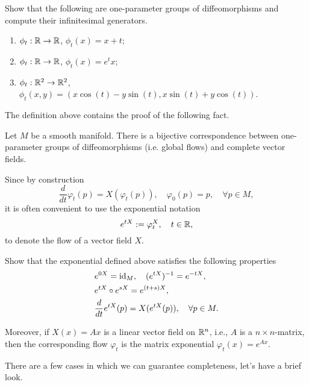 \begin{exercise}
  Show that the following are one-parameter groups of diffeomorphisms and compute their infinitesimal generators.
  \begin{enumerate}
    \item $\phi_t:\mathbb{R}\to\mathbb{R}$, $\phi_t(x) = x + t$;
    \item $\phi_t:\mathbb{R}\to\mathbb{R}$, $\phi_t(x) = e^t x$;
    \item $\phi_t:\mathbb{R}^2\to\mathbb{R}^2$, $\phi_t(x,y) = (x\cos(t) - y\sin(t), x\sin(t)+y\cos(t))$.
  \end{enumerate}
\end{exercise}

The definition above contains the proof of the following fact.
\begin{proposition}
  Let $M$ be a smooth manifold. There is a bijective correspondence between one-parameter groups of diffeomorphisms (i.e. global flows) and complete vector fields.
\end{proposition}

\begin{notation}
  Since by construction
  \begin{equation}
    \frac{d}{d t}\varphi_t(p) = X(\varphi_t(p)), \quad
    \varphi_0(p) = p, \quad \forall p\in M,
  \end{equation}
  it is often convenient to use the exponential notation
  \begin{equation}
    e^{t X} := \varphi^X_t, \quad t\in\mathbb{R},
  \end{equation}
  to denote the flow of a vector field $X$.
\end{notation}

\begin{exercise}
  Show that the exponential defined above satisfies the following properties
  \begin{align}
    &e^{0X} = \operatorname{id}_M, \quad (e^{tX})^{-1} = e^{-tX}, \\
    &e^{t X}\circ e^{s X}= e^{(t+s)X},\\
    &\frac{d}{d t} e^{tX} (p) = X(e^{tX}(p)), \quad \forall p\in M.
  \end{align}

  Moreover, if $X(x) = Ax$ is a linear vector field on $\mathbb{R}^n$, i.e., $A$ is a $n\times n$-matrix, then the corresponding flow $\varphi_t$ is the matrix exponential $\varphi_t(x) = e^{Ax}$.
\end{exercise}

There are a few cases in which we can guarantee completeness, let's have a brief look.


